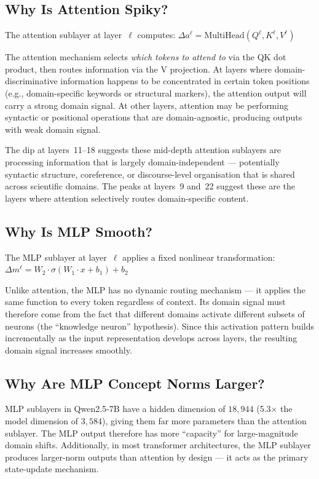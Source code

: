 \documentclass[11pt]{article}
\newcommand{\attn}{\Delta a}
\newcommand{\mlp}{\Delta m}
\begin{document}
\subsection{Why Is Attention Spiky?}

The attention sublayer at layer~$\ell$ computes:
$\attn^\ell = \text{MultiHead}(Q^\ell, K^\ell, V^\ell)$

The attention mechanism selects \emph{which tokens to attend to} via the QK dot product, then routes information via the V projection. At layers where domain-discriminative information happens to be concentrated in certain token positions (e.g., domain-specific keywords or structural markers), the attention output will carry a strong domain signal. At other layers, attention may be performing syntactic or positional operations that are domain-agnostic, producing outputs with weak domain signal.

The dip at layers~11--18 suggests these mid-depth attention sublayers are processing information that is largely domain-independent --- potentially syntactic structure, coreference, or discourse-level organisation that is shared across scientific domains. The peaks at layers~9 and~22 suggest these are the layers where attention selectively routes domain-specific content.

\subsection{Why Is MLP Smooth?}

The MLP sublayer at layer~$\ell$ applies a fixed nonlinear transformation:
$\mlp^\ell = W_2 \cdot \sigma(W_1 \cdot x + b_1) + b_2$

Unlike attention, the MLP has no dynamic routing mechanism --- it applies the same function to every token regardless of context. Its domain signal must therefore come from the fact that different domains activate different subsets of neurons (the ``knowledge neuron'' hypothesis). Since this activation pattern builds incrementally as the input representation develops across layers, the resulting domain signal increases smoothly.

\subsection{Why Are MLP Concept Norms Larger?}

MLP sublayers in Qwen2.5-7B have a hidden dimension of $18{,}944$ (5.3$\times$ the model dimension of $3{,}584$), giving them far more parameters than the attention sublayer. The MLP output therefore has more ``capacity'' for large-magnitude domain shifts. Additionally, in most transformer architectures, the MLP sublayer produces larger-norm outputs than attention by design --- it acts as the primary state-update mechanism.
\end{document}
